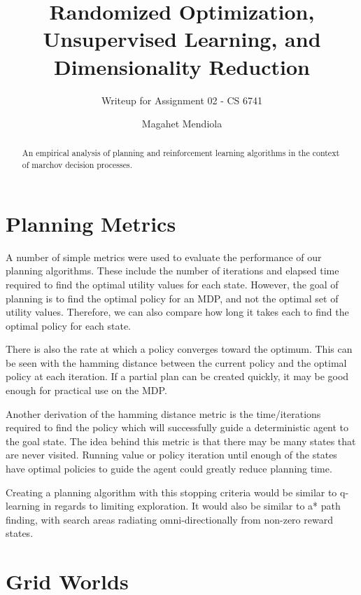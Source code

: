 \documentclass{sig-alternate}
\begin{document}
\title{Randomized Optimization, Unsupervised Learning, and Dimensionality Reduction}
\subtitle{Writeup for Assignment 02 - CS 6741}

\author{
\alignauthor
Magahet Mendiola
}
\date{}

\maketitle
\begin{abstract}
An empirical analysis of planning and reinforcement learning algorithms in the context of marchov decision processes.
\end{abstract}

\section{Planning Metrics}
A number of simple metrics were used to evaluate the performance of our planning algorithms. These include the number of iterations and elapsed time required to find the optimal utility values for each state. However, the goal of planning is to find the optimal policy for an MDP, and not the optimal set of utility values. Therefore, we can also compare how long it takes each to find the optimal policy for each state.

There is also the rate at which a policy converges toward the optimum. This can be seen with the hamming distance between the current policy and the optimal policy at each iteration. If a partial plan can be created quickly, it may be good enough for practical use on the MDP.

Another derivation of the hamming distance metric is the time/iterations required to find the policy which will successfully guide a deterministic agent to the goal state. The idea behind this metric is that there may be many states that are never visited. Running value or policy iteration until enough of the states have optimal policies to guide the agent could greatly reduce planning time.

Creating a planning algorithm with this stopping criteria would be similar to q-learning in regards to limiting exploration. It would also be similar to a* path finding, with search areas radiating omni-directionally from non-zero reward states.


\section{Grid Worlds}
\end{document}
